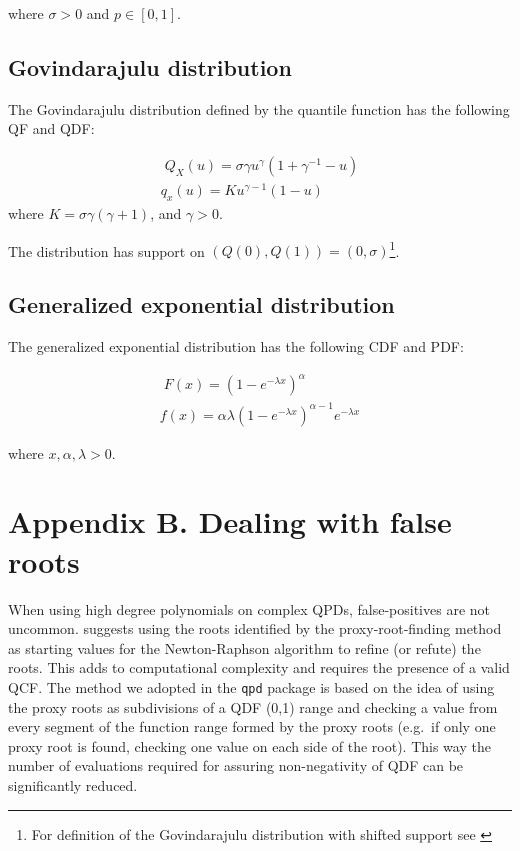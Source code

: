 \documentclass[ba]{imsart}
\numberwithin{equation}{section}
\theoremstyle{plain}
\begin{document}
where \(\sigma>0\) and \(p \in [0,1]\).

\hypertarget{govindarajulu-distribution}{%
\subsection*{Govindarajulu distribution}\label{govindarajulu-distribution}}

The Govindarajulu distribution defined by the quantile function has the following QF and QDF:

\[
\begin{gathered}\;
Q_X(u)=\sigma\gamma u^\gamma(1+\gamma^{-1}-u)\\
q_x(u)=Ku^{\gamma-1}(1-u)
\end{gathered}
\]
where \(K=\sigma\gamma(\gamma+1)\), and \(\gamma>0\).

The distribution has support on \((Q(0), Q(1))=(0, \sigma)\)\footnote{For definition of the Govindarajulu distribution with shifted support see \citet{nair2012GovindarajuluDistributionProperties}}.

\hypertarget{generalized-exponential-distribution}{%
\subsection*{Generalized exponential distribution}\label{generalized-exponential-distribution}}

The generalized exponential distribution has the following CDF and PDF:

\[
\begin{gathered}\;
F(x)=(1-e^{-\lambda x})^\alpha \\
f(x)=\alpha\lambda(1-e^{-\lambda x})^{\alpha-1}e^{-\lambda x}
\end{gathered}
\]

where \(x, \alpha, \lambda>0\).

\hypertarget{appendix-b.-dealing-with-false-roots}{%
\section*{Appendix B. Dealing with false roots}\label{appendix-b.-dealing-with-false-roots}}

When using high degree polynomials on complex QPDs, false-positives are not uncommon. \citet{boyd2006ComputingRealRoots} suggests using the roots identified by the proxy-root-finding method as starting values for the Newton-Raphson algorithm to refine (or refute) the roots. This adds to computational complexity and requires the presence of a valid QCF. The method we adopted in the \texttt{qpd} package is based on the idea of using the proxy roots as subdivisions of a QDF (0,1) range and checking a value from every segment of the function range formed by the proxy roots (e.g.~if only one proxy root is found, checking one value on each side of the root). This way the number of evaluations required for assuring non-negativity of QDF can be significantly reduced.
\end{document}
